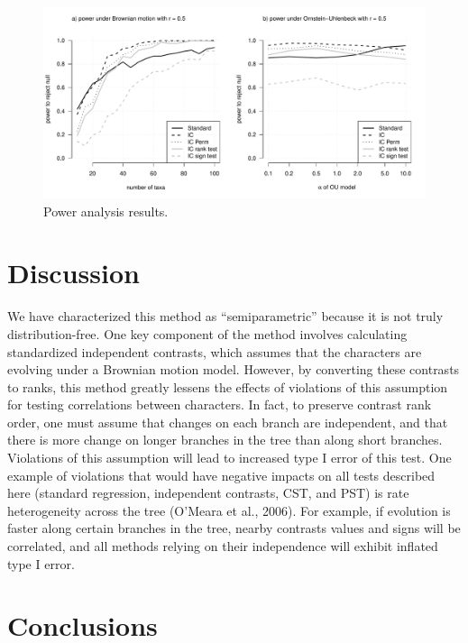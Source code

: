 \documentclass[fleqn,10pt,lineno]{wlpeerj} %
\begin{document}
\begin{figure}
\includegraphics[width=1\linewidth]{Harmon-and-Revell_NonParametricPCM.PeerJ_files/figure-latex/Harmon-fig3-1} \caption{Power analysis results.}\label{fig:Harmon-fig3}
\end{figure}

\section{Discussion}\label{discussion}

We have characterized this method as ``semiparametric'' because it is not truly distribution-free. One key component of the method involves calculating standardized independent contrasts, which assumes that the characters are evolving under a Brownian motion model. However, by converting these contrasts to ranks, this method greatly lessens the effects of violations of this assumption for testing correlations between characters. In fact, to preserve contrast rank order, one must assume that changes on each branch are independent, and that there is more change on longer branches in the tree than along short branches. Violations of this assumption will lead to increased type I error of this test. One example of violations that would have negative impacts on all tests described here (standard regression, independent contrasts, CST, and PST) is rate heterogeneity across the tree (O'Meara et al., 2006). For example, if evolution is faster along certain branches in the tree, nearby contrasts values and signs will be correlated, and all methods relying on their independence will exhibit inflated type I error.

\section{Conclusions}\label{conclusions}
\end{document}
